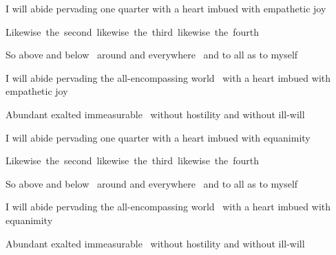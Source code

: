 \medskip

\ifninebythirteen\clearpage\fi

\begin{english-hang}
  I will abide pervading one quarter with a heart imbued with empathetic joy\ifdigital\makeatletter\hyperlink{endnote97-appendix}\makeatother\fi
\end{english-hang}
\begin{english-hang}
 Likewise~the~second~likewise~the~third~likewise~the~fourth
\end{english-hang}
\begin{english-hang}
  So above and below \breathmark\ around and everywhere \breathmark\ and to all as to myself
\end{english-hang}
\begin{english-hang}
  I will abide pervading the all-encompassing world \breathmark\ with a heart imbued with empathetic joy
\end{english-hang}
\begin{english-hang}
  Abundant exalted immeasurable \breathmark\ without hostility and without ill-will
\end{english-hang}

\smallskip

\ifbfive\clearpage\fi
\ifafive\clearpage\fi

\begin{english-hang}
  I will abide pervading one quarter with a heart imbued with equanimity
\end{english-hang}
\begin{english-hang}
 Likewise~the~second~likewise~the~third~likewise~the~fourth
\end{english-hang}
\begin{english-hang}
  So above and below \breathmark\ around and everywhere \breathmark\ and to all as to myself
\end{english-hang}
\begin{english-hang}
  I will abide pervading the all-encompassing world \breathmark\ with a heart imbued with equanimity
\end{english-hang}
\begin{english-hang}
  Abundant exalted immeasurable \breathmark\ without hostility and without ill-will
\end{english-hang}

